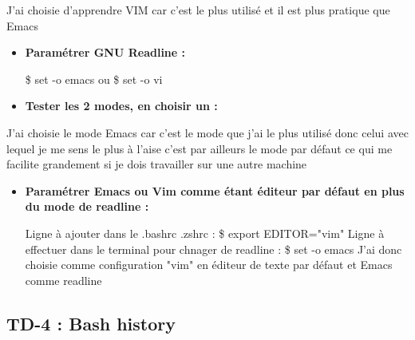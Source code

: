 \documentclass[12pt]{article}
\begin{document}
J'ai choisie d'apprendre VIM car c'est le plus utilisé et il est plus pratique que Emacs

\vspace{0.3cm}

\begin{itemize}
  \item \textbf{Paramétrer GNU Readline :}
  \vspace{0.3cm}

  \$ set -o emacs \newline
  ou \newline
  \$ set -o vi \newline
\end{itemize}

\begin{itemize}
  \item \textbf{Tester les 2 modes, en choisir un :}
\end{itemize}
\vspace{0.3cm}

J'ai choisie le mode Emacs car c'est le mode que j'ai le plus utilisé donc celui avec lequel je me sens le plus à l'aise
c'est par ailleurs le mode par défaut ce qui me facilite grandement si je dois travailler sur une autre machine

\vspace{0.3cm}

\begin{itemize}
  \item \textbf{Paramétrer Emacs ou Vim comme étant éditeur par défaut en plus du mode de readline :}

  \vspace{0.3cm}

  Ligne à ajouter dans le .bashrc .zshrc :
  \vspace{0.3cm} \newline
  \$ export EDITOR="vim"
  \vspace{0.3cm} \newline
  Ligne à effectuer dans le terminal pour chnager de readline :
  \vspace{0.3cm} \newline
  \$ set -o emacs \newline
  \newline
  J'ai donc choisie comme configuration "vim" en éditeur de texte par défaut et Emacs comme readline
\end{itemize}

  \subsection{TD-4 : Bash history}
  \vspace{0.3cm}
\end{document}
